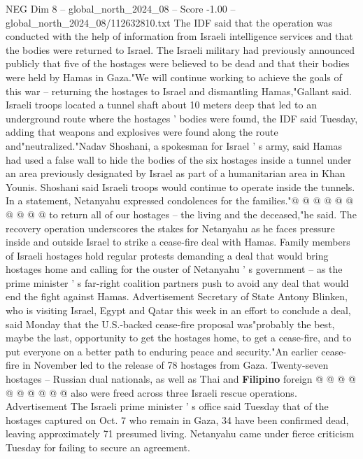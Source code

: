 \begin{textsample}{NEG Dim 8 – global\_north\_2024\_08 – Score -1.00 – global\_north\_2024\_08/112632810.txt}  \label{ex:f8_neg_126}
The IDF said that the operation was conducted with the help of information from Israeli intelligence services and that the bodies were returned to Israel.
The Israeli military had previously announced publicly that five of the hostages were believed to be dead and that their bodies were held by Hamas in Gaza."We will continue working to achieve the goals of this war -- returning the hostages to Israel and dismantling Hamas,"Gallant said.
Israeli troops located a tunnel shaft about 10 meters deep that led to an underground route where the hostages ' bodies were found, the IDF said Tuesday, adding that weapons and explosives were found along the route and"neutralized."Nadav Shoshani, a spokesman for Israel ' s army, said Hamas had used a false wall to hide the bodies of the six hostages inside a tunnel under an area previously designated by Israel as part of a humanitarian area in Khan Younis.
Shoshani said Israeli troops would continue to operate inside the tunnels.
In a statement, Netanyahu expressed condolences for the families."@ @ @ @ @ @ @ @ @ @ to return all of our hostages -- the living and the deceased,"he said.
The recovery operation underscores the stakes for Netanyahu as he faces pressure inside and outside Israel to strike a cease-fire deal with Hamas.
Family members of Israeli hostages hold regular protests demanding a deal that would bring hostages home and calling for the ouster of Netanyahu ' s government -- as the prime minister ' s far-right coalition partners push to avoid any deal that would end the fight against Hamas.
Advertisement Secretary of State Antony Blinken, who is visiting Israel, Egypt and Qatar this week in an effort to conclude a deal, said Monday that the U.S.-backed cease-fire proposal was"probably the best, maybe the last, opportunity to get the hostages home, to get a cease-fire, and to put everyone on a better path to enduring peace and security."An earlier cease-fire in November led to the release of 78 hostages from Gaza.
Twenty-seven hostages -- Russian dual nationals, as well as Thai and \textbf{Filipino} foreign @ @ @ @ @ @ @ @ @ @ also were freed across three Israeli rescue operations.
Advertisement The Israeli prime minister ' s office said Tuesday that of the hostages captured on Oct. 7 who remain in Gaza, 34 have been confirmed dead, leaving approximately 71 presumed living.
Netanyahu came under fierce criticism Tuesday for failing to secure an agreement.

\end{textsample}
